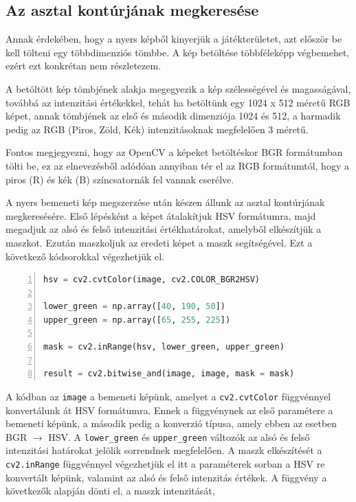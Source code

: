 \subsection{Az asztal kontúrjának megkeresése}
Annak érdekében, hogy a nyers képből kinyerjük a játékterületet, azt először be kell tölteni egy többdimenziós tömbbe. A kép betöltése többféleképp végbemehet, ezért ezt konkrétan nem részletezem.
\par A betöltött kép tömbjének alakja megegyezik a kép szélességével és magasságával, továbbá az intenzitási értékekkel, tehát ha betöltünk egy 1024 x 512 méretű RGB képet, annak tömbjének az első és második dimenziója 1024 és 512, a harmadik pedig az RGB (Piros, Zöld, Kék) intenzitásoknak megfelelően 3 méretű.
\par Fontos megjegyezni, hogy az OpenCV a képeket betöltéskor BGR formátumban tölti be, ez az elnevezésből adódóan annyiban tér el az RGB formátumtól, hogy a piros (R) és kék (B) színcsatornák fel vannak cserélve.
\par A nyers bemeneti kép megszerzése után készen állunk az asztal kontúrjának megkeresésére. Első lépésként a képet átalakítjuk HSV formátumra, majd megadjuk az alsó és felső intenzitási értékhatárokat, amelyből elkészítjük a maszkot. Ezután maszkoljuk az eredeti képet a maszk segítségével.
\newline Ezt a következő kódsorokkal végezhetjük el.


\vspace{2mm}\begin{lstlisting}[language=Python, numbers=left]
hsv = cv2.cvtColor(image, cv2.COLOR_BGR2HSV)

lower_green = np.array([40, 190, 50])
upper_green = np.array([65, 255, 225])

mask = cv2.inRange(hsv, lower_green, upper_green)

result = cv2.bitwise_and(image, image, mask = mask)
\end{lstlisting}

\par A kódban az \lstinline{image} a bemeneti képünk, amelyet a \lstinline{cv2.cvtColor} függvénnyel \cite{cv2_cvt_color} konvertálunk át HSV formátumra. Ennek a függvénynek az első paramétere a bemeneti képünk, a második pedig a konverzió típusa, amely ebben az esetben BGR $\rightarrow$ HSV. A \lstinline{lower_green} és \lstinline{upper_green} változók az alsó és felső intenzitási határokat jelölik sorrendnek megfelelően. A maszk elkészítését a \lstinline{cv2.inRange} függvénnyel \cite{cv2_in_range} végezhetjük el itt a paraméterek sorban a HSV re konvertált képünk, valamint az alsó és felső intenzitás értékek.
\newline A függvény a következők alapján dönti el, a maszk intenzitását,

